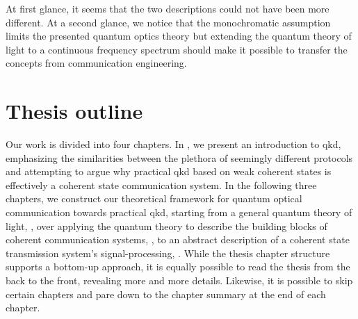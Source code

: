 At first glance, it seems that the two descriptions could not have been more different.
At a second glance, we notice that the monochromatic assumption limits the presented quantum optics theory but extending the quantum theory of light to a continuous frequency spectrum should make it possible to transfer the concepts from communication engineering.



\section*{Thesis outline}

Our work is divided into four chapters.
In , we present an introduction to \gls{qkd}, emphasizing the similarities between the plethora of seemingly different protocols and attempting to argue why practical \gls{qkd} based on weak coherent states is effectively a coherent state communication system.
In the following three chapters, we construct our theoretical framework for quantum optical communication towards practical \gls{qkd}, starting from a general quantum theory of light, , over applying the quantum theory to describe the building blocks of coherent communication systems, , to an abstract description of a coherent state transmission system's signal-processing, .
While the thesis chapter structure supports a bottom-up approach, it is equally possible to read the thesis from the back to the front, revealing more and more details.
Likewise, it is possible to skip certain chapters and pare down to the chapter summary at the end of each chapter.